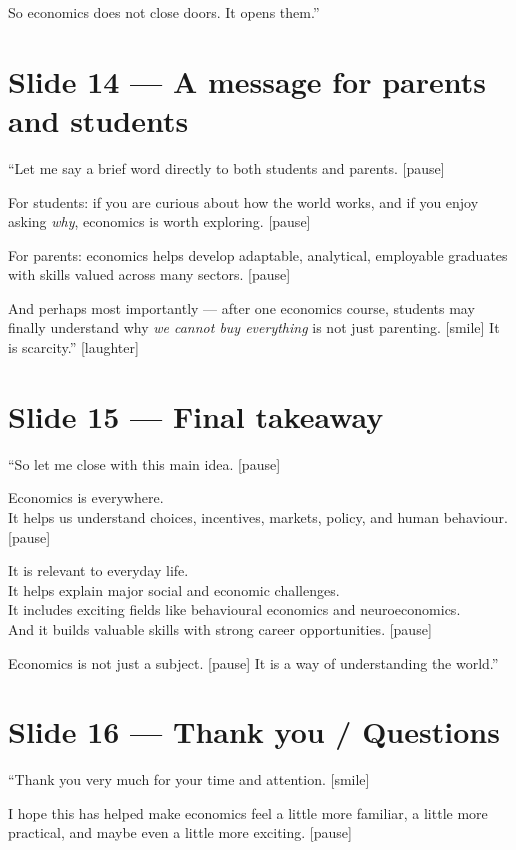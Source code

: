 \documentclass[12pt]{article}
\begin{document}
So economics does not close doors. It opens them.''

\section*{Slide 14 --- A message for parents and students}

``Let me say a brief word directly to both students and parents. [pause]

For students: if you are curious about how the world works, and if you enjoy asking \textit{why}, economics is worth exploring. [pause]

For parents: economics helps develop adaptable, analytical, employable graduates with skills valued across many sectors. [pause]

And perhaps most importantly --- after one economics course, students may finally understand why \textit{we cannot buy everything} is not just parenting. [smile] It is scarcity.'' [laughter]

\section*{Slide 15 --- Final takeaway}

``So let me close with this main idea. [pause]

Economics is everywhere.\\
It helps us understand choices, incentives, markets, policy, and human behaviour. [pause]

It is relevant to everyday life.\\
It helps explain major social and economic challenges.\\
It includes exciting fields like behavioural economics and neuroeconomics.\\
And it builds valuable skills with strong career opportunities. [pause]

Economics is not just a subject. [pause] It is a way of understanding the world.''

\section*{Slide 16 --- Thank you / Questions}

``Thank you very much for your time and attention. [smile]

I hope this has helped make economics feel a little more familiar, a little more practical, and maybe even a little more exciting. [pause]
\end{document}
